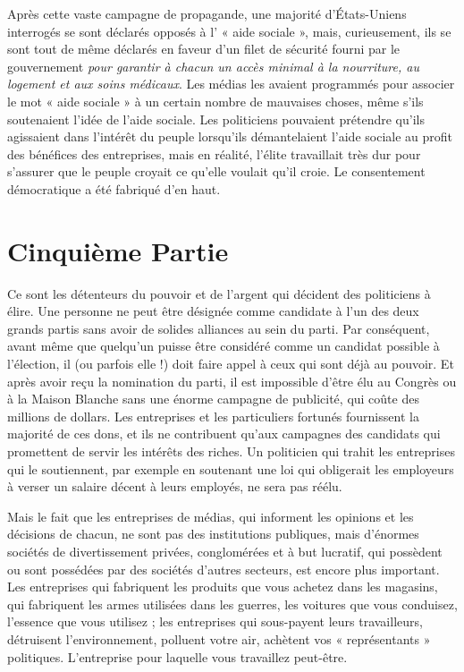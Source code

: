 Après cette vaste campagne de propagande, une majorité d'États-Uniens interrogés se sont déclarés opposés à l' « aide sociale », mais, curieusement, ils se sont tout de même déclarés en faveur d'un filet de sécurité fourni par le gouvernement \emph{pour garantir à chacun un accès minimal à la nourriture, au logement et aux soins médicaux}. Les médias les avaient programmés pour associer le mot « aide sociale » à un certain nombre de mauvaises choses, même s'ils soutenaient l'idée de l'aide sociale. Les politiciens pouvaient prétendre qu'ils agissaient dans l'intérêt du peuple lorsqu'ils démantelaient l'aide sociale au profit des bénéfices des entreprises, mais en réalité, l'élite travaillait très dur pour s'assurer que le peuple croyait ce qu'elle voulait qu'il croie. Le consentement démocratique a été fabriqué d'en haut.

\chapter*{\textbf{Cinquième Partie}}

Ce sont les détenteurs du pouvoir et de l'argent qui décident des politiciens à élire. Une personne ne peut être désignée comme candidate à l'un des deux grands partis sans avoir de solides alliances au sein du parti. Par conséquent, avant même que quelqu’un puisse être considéré comme un candidat possible à l'élection, il (ou parfois elle !) doit faire appel à ceux qui sont déjà au pouvoir. Et après avoir reçu la nomination du parti, il est impossible d'être élu au Congrès ou à la Maison Blanche sans une énorme campagne de publicité, qui coûte des millions de dollars. Les entreprises et les particuliers fortunés fournissent la majorité de ces dons, et ils ne contribuent qu'aux campagnes des candidats qui promettent de servir les intérêts des riches. Un politicien qui trahit les entreprises qui le soutiennent, par exemple en soutenant une loi qui obligerait les employeurs à verser un salaire décent à leurs employés, ne sera pas réélu.

Mais le fait que les entreprises de médias, qui informent les opinions et les décisions de chacun, ne sont pas des institutions publiques, mais d'énormes sociétés de divertissement privées, conglomérées et à but lucratif, qui possèdent ou sont possédées par des sociétés d'autres secteurs, est encore plus important. Les entreprises qui fabriquent les produits que vous achetez dans les magasins, qui fabriquent les armes utilisées dans les guerres, les voitures que vous conduisez, l'essence que vous utilisez ; les entreprises qui sous-payent leurs travailleurs, détruisent l'environnement, polluent votre air, achètent vos « représentants » politiques. L'entreprise pour laquelle vous travaillez peut-être.

